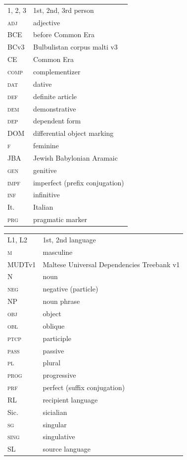 \documentclass[output=paper]{langsci/langscibook}
\begin{document}
\begin{tabularx}{.45\textwidth}{lQ}
\textsc{1, 2, 3} & 1st, 2nd, 3rd person \\
\textsc{adj} & adjective \\
BCE & before Common Era \\
\textsc BCv3 & Bulbulistan corpus malti v3 \\
CE & Common Era \\
\textsc{comp} & complementizer \\
\textsc{dat} & dative \\
\textsc{def} & definite article \\
\textsc{dem} & demonstrative \\
\textsc{dep} & dependent form \\
DOM & differential object marking \\
\textsc{f} & feminine \\
JBA & Jewish Babylonian Aramaic \\
\textsc{gen} & genitive \\
\textsc{impf} & imperfect (prefix conjugation) \\
\textsc{inf} & infinitive \\
It. & Italian \\
\textsc{prg} & pragmatic marker \\
\end{tabularx}
\begin{tabularx}{.45\textwidth}{lQ}
\textsc{L1, L2} & 1st, 2nd language \\
\textsc{m} & masculine \\
MUDTv1 & Maltese Universal Dependencies Treebank v1 \\
\textsc{N} & noun \\
\textsc{neg} & negative (particle) \\
NP & noun phrase\\
\textsc{obj} & object \\
\textsc{obl} & oblique \\
\textsc{ptcp} & participle \\
\textsc{pass} & passive \\
\textsc{pl} & plural \\
\textsc{prog} & progressive \\
\textsc{prf} & perfect (suffix conjugation) \\
RL & recipient language \\
Sic. & sicialian \\
\textsc{sg} & singular \\
\textsc{sing} & singulative \\
SL & source language \\
\end{tabularx}
\end{document}

